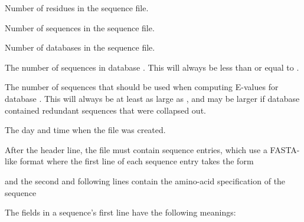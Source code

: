 \documentclass[notoc,justified]{tufte-book}    %
\begin{document}
\begin{sreitems}{}

\item [\monob{res\_cnt}] Number of residues in the sequence file.

\item [\monob{seq\_cnt}] Number of sequences in the sequence file. 

\item [\monob{db\_cnt}] Number of databases in the sequence file. 

\item [\monob{cnt\_i}] The number of sequences in database . This will always be less than or equal to .
 
\item [\monob{fullcnt\_i}] The number of sequences that should be used when computing E-values for database .  This will always be at least as large as , and may be larger if database  contained redundant sequences that were collapsed out.

\item [\monob{date\_stamp}] The day and time when the file was created.
\end{sreitems}

After the header line, the file must contain  sequence entries, which use a FASTA-like format where the first line of each sequence entry takes the form 


and the second and following lines contain the amino-acid specification of the sequence  

The fields in a sequence's first line have the following meanings:
\end{document}
